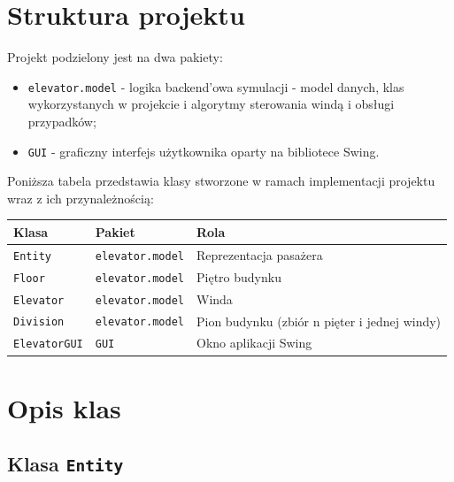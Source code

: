 \documentclass[12pt, a4paper]{article}
\begin{document}
\section{Struktura projektu}
\label{sec:struktura}

Projekt podzielony jest na dwa pakiety:

\begin{itemize}
  \item \texttt{elevator.model} - logika backend'owa symulacji - model danych, klas wykorzystanych w projekcie i algorytmy
                                    sterowania windą i obsługi przypadków;
  \item \texttt{GUI} - graficzny interfejs użytkownika oparty na bibliotece Swing.
\end{itemize}

Poniższa tabela przedstawia klasy stworzone w ramach implementacji projektu wraz z ich przynależnością:

\begin{center}
\begin{tabular}{lll}
  \toprule
  \textbf{Klasa} & \textbf{Pakiet} & \textbf{Rola} \\
  \midrule
  \texttt{Entity}    & \texttt{elevator.model} & Reprezentacja pasażera \\
  \texttt{Floor}     & \texttt{elevator.model} & Piętro budynku \\
  \texttt{Elevator}  & \texttt{elevator.model} & Winda  \\
  \texttt{Division}  & \texttt{elevator.model} & Pion budynku (zbiór n pięter i jednej windy) \\
  \texttt{ElevatorGUI} & \texttt{GUI}          & Okno aplikacji Swing \\
  \bottomrule
\end{tabular}
\end{center}









\section{Opis klas}
\label{sec:klasy}





\subsection{Klasa \texttt{Entity}}
\label{subsec:entity}
\end{document}
